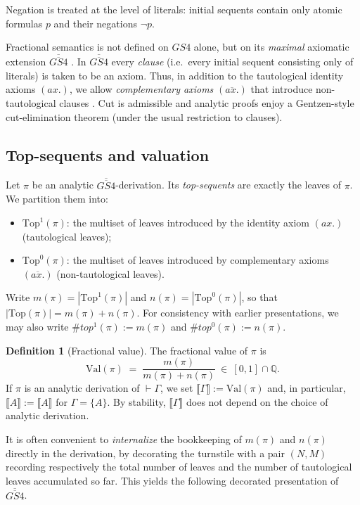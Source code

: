 \documentclass[12pt,a4paper,reqno]{amsart}
\theoremstyle{definition}
\newtheorem{definition}[theorem]{Definition}
\newcommand{\numberset}{\mathbb}
\newcommand{\Q}{\numberset{Q}}
\begin{document}
\medskip
\noindent
Negation is treated at the level of literals: initial sequents contain only atomic formulas $p$ and their negations $\neg p$.

Fractional semantics is not defined on $GS4$ alone, but on its \emph{maximal} axiomatic extension $\overline{\overline{GS4}}$ \cite{piazzapulcini:fractional}. In $\overline{\overline{GS4}}$ every \emph{clause} (i.e.\ every initial sequent consisting only of literals) is taken to be an axiom. Thus, in addition to the tautological identity axioms $(ax.)$, we allow \emph{complementary axioms} $(\overline{ax.})$ that introduce non-tautological clauses \cite{avron:gentzen}. Cut is admissible and analytic proofs enjoy a Gentzen-style cut-elimination theorem (under the usual restriction to clauses).

\subsection*{Top-sequents and valuation}

Let $\pi$ be an analytic $\overline{\overline{GS4}}$-derivation. Its \emph{top-sequents} are exactly the leaves of $\pi$.
We partition them into:
\begin{itemize}
 \item $\mathrm{Top}^1(\pi)$: the multiset of leaves introduced by the identity axiom $(ax.)$ (tautological leaves);
 \item $\mathrm{Top}^0(\pi)$: the multiset of leaves introduced by complementary axioms $(\overline{ax.})$ (non-tautological leaves).
\end{itemize}
Write $m(\pi)=|\mathrm{Top}^1(\pi)|$ and $n(\pi)=|\mathrm{Top}^0(\pi)|$, so that $|\mathrm{Top}(\pi)|=m(\pi)+n(\pi)$.
For consistency with earlier presentations, we may also write $\#top^1(\pi):=m(\pi)$ and $\#top^0(\pi):=n(\pi)$.

\begin{definition}[Fractional value]\label{def:fractional-value}
The fractional value of $\pi$ is
\[
\mathrm{Val}(\pi)\;=\;\frac{m(\pi)}{m(\pi)+n(\pi)}\ \in\ [0,1]\cap\Q.
\]
If $\pi$ is an analytic derivation of $\vdash \Gamma$, we set $\llbracket \Gamma\rrbracket := \mathrm{Val}(\pi)$ and, in particular, $\llbracket A\rrbracket := \llbracket A\rrbracket$ for $\Gamma=\{A\}$.
By stability, $\llbracket \Gamma\rrbracket$ does not depend on the choice of analytic derivation.
\end{definition}
 It is often convenient to \emph{internalize} the bookkeeping of $m(\pi)$ and $n(\pi)$ directly in the derivation, by decorating the turnstile with a pair $(N,M)$ recording respectively the total number of leaves and the number of tautological leaves accumulated so far. This yields the following decorated presentation of $\overline{\overline{GS4}}$. 
\end{document}
